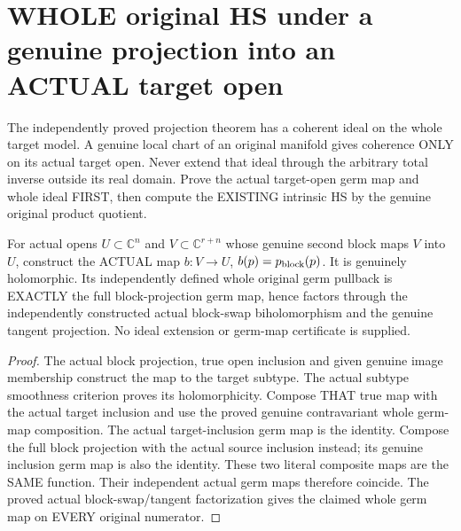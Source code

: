 \section{WHOLE original HS under a genuine projection into an ACTUAL target open}

The independently proved projection theorem has a coherent ideal on the
whole target model. A genuine local chart of an original manifold gives
coherence ONLY on its actual target open. Never extend that ideal through
the arbitrary total inverse outside its real domain. Prove the actual
target-open germ map and whole ideal FIRST, then compute the EXISTING
intrinsic HS by the genuine original product quotient.

\begin{lemma}
\label{hir:actual-target-open-block-projection-germ}
\leanok
For actual opens $U\subset\mathbb C^n$ and $V\subset\mathbb C^{r+n}$
whose genuine second block maps $V$ into $U$, construct the ACTUAL map
$b:V\to U$, $b(p)=p_{\rm block}(p)$. It is genuinely holomorphic. Its
independently defined whole original germ pullback is EXACTLY the full
block-projection germ map, hence factors through the independently
constructed actual block-swap biholomorphism and the genuine tangent
projection. No ideal extension or germ-map certificate is supplied.
\end{lemma}
\begin{proof}
The actual block projection, true open inclusion and given genuine image
membership construct the map to the target subtype. The actual subtype
smoothness criterion proves its holomorphicity. Compose THAT true map
with the actual target inclusion and use the proved genuine contravariant
whole germ-map composition. The actual target-inclusion germ map is the
identity. Compose the full block projection with the actual source
inclusion instead; its genuine inclusion germ map is also the identity.
These two literal composite maps are the SAME function. Their independent
actual germ maps therefore coincide. The proved actual block-swap/tangent
factorization gives the claimed whole germ map on EVERY original numerator.
\end{proof}

